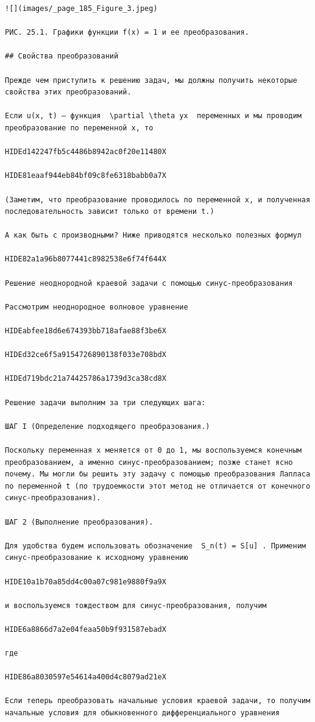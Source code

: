 \documentclass[
  ukrainian,
]{article}
\begin{document}
\begin{verbatim}
![](images/_page_185_Figure_3.jpeg)

РИС. 25.1. Графики функции f(x) = 1 и ее преобразования.

## Свойства преобразований

Прежде чем приступить к решению задач, мы должны получить некоторые свойства этих преобразований.

Если u(x, t) — функция  \partial \theta yx  переменных и мы проводим преобразование по переменной x, то

HIDEd142247fb5c4486b8942ac0f20e11480X

HIDE81eaaf944eb84bf09c8fe6318babb0a7X

(Заметим, что преобразование проводилось по переменной x, и полученная последовательность зависит только от времени t.)

А как быть с производными? Ниже приводятся несколько полезных формул

HIDE82a1a96b8077441c8982538e6f74f644X

Решение неоднородной краевой задачи с помощью синус-преобразования

Рассмотрим неоднородное волновое уравнение

HIDEabfee18d6e674393bb718afae88f3be6X

HIDEd32ce6f5a9154726890138f033e708bdX

HIDEd719bdc21a74425786a1739d3ca38cd8X

Решение задачи выполним за три следующих шага:

ШАГ І (Определение подходящего преобразования.)

Поскольку переменная x меняется от 0 до 1, мы воспользуемся конечным преобразованием, а именно синус-преобразованием; позже станет ясно почему. Мы могли бы решить эту задачу с помощью преобразования Лапласа по переменной t (по трудоемкости этот метод не отличается от конечного синус-преобразования).

ШАГ 2 (Выполнение преобразования).

Для удобства будем использовать обозначение  S_n(t) = S[u] . Применим синус-преобразование к исходному уравнению

HIDE10a1b70a85dd4c00a07c981e9880f9a9X

и воспользуемся тождеством для синус-преобразования, получим

HIDE6a8866d7a2e04feaa50b9f931587ebadX

где

HIDE86a8030597e54614a400d4c8079ad21eX

Если теперь преобразовать начальные условия краевой задачи, то получим начальные условия для обыкновенного дифференциального уравнения


\end{verbatim}
\end{document}
